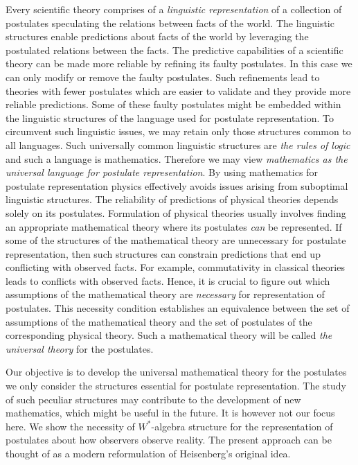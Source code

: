 \documentclass[11pt]{article}
\begin{document}
\vspace{2.5em}
\noindent Every scientific theory comprises of a \emph{linguistic representation} of a collection of postulates speculating the relations between facts of the world. The linguistic structures enable predictions about facts of the world by leveraging the postulated relations between the facts. The predictive capabilities of a scientific theory can be made more reliable by refining its faulty postulates. In this case we can only modify or remove the faulty postulates. Such refinements lead to theories with fewer postulates which are easier to validate and they provide more reliable predictions. Some of these faulty postulates might be embedded within the linguistic structures of the language used for postulate representation. To circumvent such linguistic issues, we may retain only those structures common to all languages. Such universally common linguistic structures are \emph{the rules of logic} and such a language is mathematics. Therefore we may view \emph{mathematics as the universal language for postulate representation}. By using mathematics for postulate representation physics effectively avoids issues arising from suboptimal linguistic structures. The reliability of predictions of physical theories depends solely on its postulates. Formulation of physical theories usually involves finding an appropriate mathematical theory where its postulates \emph{can} be represented. If some of the structures of the mathematical theory are unnecessary for postulate representation, then such structures can constrain predictions that end up conflicting with observed facts. For example, commutativity in classical theories leads to conflicts with observed facts. Hence, it is crucial to figure out which assumptions of the mathematical theory are \emph{necessary} for representation of postulates. This necessity condition establishes an equivalence between the set of assumptions of the mathematical theory and the set of postulates of the corresponding physical theory. Such a mathematical theory will be called \emph{the universal theory} for the postulates.

Our objective is to develop the universal mathematical theory for the postulates we only consider the structures essential for postulate representation. The study of such peculiar structures may contribute to the development of new mathematics, which might be useful in the future. It is however not our focus here. 
We show the necessity of $W^*$-algebra structure for the representation of postulates about how observers observe reality. The present approach can be thought of as a modern reformulation of Heisenberg's original idea.
\end{document}
